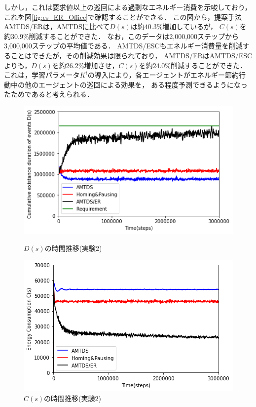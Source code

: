 \documentclass[12pt,a4j,twoside]{jarticle}
\begin{document}
  しかし，これは要求値以上の巡回による過剰なエネルギー消費を示唆しており，
  これを図\ref{fig:cs_ER_Office}で確認することができる．
  この図から，提案手法AMTDS/ERは，AMTDSに比べて$D(s)$は約$40.3\%$増加しているが，
  $C(s)$を約$30.9\%$削減することができた．
  なお，このデータは2,000,000ステップから3,000,000ステップの平均値である．
  AMTDS/ESCもエネルギー消費量を削減することはできたが，その削減効果は限られており，
  AMTDS/ERはAMTDS/ESCよりも，$D(s)$を約$26.2\%$増加させ，$C(s)$を約$24.0\%$削減することができた．
  これは，学習パラメータ$K^i$の導入により，各エージェントがエネルギー節約行動中の他のエージェントの巡回による効果を，
  ある程度予測できるようになったためであると考えられる．


  \begin{figure}
    \centering
    \includegraphics[width=0.9\hsize]{figures/ds_graph_3600_ave_ER_Complex_600.png}
    \caption{$D(s)$の時間推移(実験2)}
    \label{fig:ds_ER_Complex}
    \vspace{12pt}
    \centering
    \includegraphics[width=0.9\hsize]{figures/cs_graph_3600_ave_ER_Complex_600.png}
    \caption{$C(s)$の時間推移(実験2)}
    \label{fig:cs_ER_Complex}
  \end{figure}
  
\end{document}
